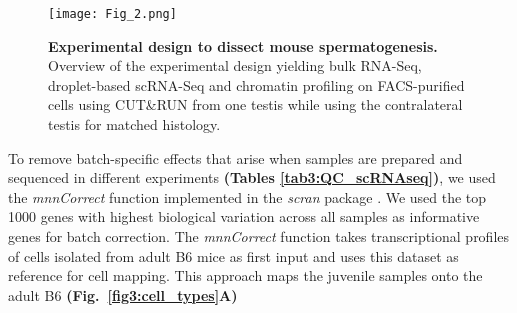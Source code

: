 \begin{figure}[!h]
\centering
\texttt{[image: Fig\_2.png]}
\caption[Experimental design to dissect mouse spermatogenesis]{\textbf{Experimental design to dissect mouse spermatogenesis.}\\
Overview of the experimental design yielding bulk RNA-Seq, droplet-based scRNA-Seq and chromatin profiling on FACS-purified cells using CUT\&{}RUN from one testis while using the contralateral testis for matched histology.}
\label{fig3:experimental_design}
\end{figure}

To remove batch-specific effects that arise when samples are prepared and sequenced in different experiments \textbf{(Tables \ref{tab3:QC_scRNAseq})}, we used the \emph{mnnCorrect} function implemented in the \emph{scran} package \citep{Haghverdi2018}. We used the top 1000 genes with highest biological variation across all samples as informative genes for batch correction. The \emph{mnnCorrect} function takes transcriptional profiles of cells isolated from adult B6 mice as first input and uses this dataset as reference for cell mapping. This approach maps the juvenile samples onto the adult B6 \textbf{(Fig.~\ref{fig3:cell_types}A)}

